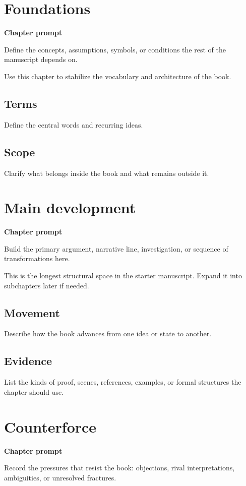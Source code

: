 \documentclass[11pt,openany]{book}
\newcommand{\chapterprompt}[1]{
\begin{chapterbox}
\textbf{Chapter prompt}\par
#1
\end{chapterbox}
}
\begin{document}
\chapter{Foundations}
\chapterprompt{Define the concepts, assumptions, symbols, or conditions the rest of the manuscript depends on.}

Use this chapter to stabilize the vocabulary and architecture of the book.

\section{Terms}

Define the central words and recurring ideas.

\section{Scope}

Clarify what belongs inside the book and what remains outside it.

\chapter{Main development}
\chapterprompt{Build the primary argument, narrative line, investigation, or sequence of transformations here.}

This is the longest structural space in the starter manuscript. Expand it into subchapters later if needed.

\section{Movement}

Describe how the book advances from one idea or state to another.

\section{Evidence}

List the kinds of proof, scenes, references, examples, or formal structures the chapter should use.

\chapter{Counterforce}
\chapterprompt{Record the pressures that resist the book: objections, rival interpretations, ambiguities, or unresolved fractures.}
\end{document}
